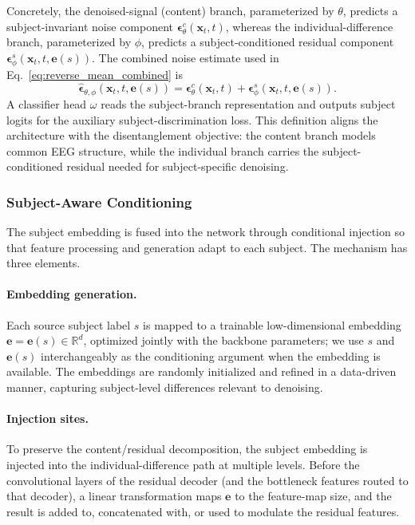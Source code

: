 Concretely, the denoised-signal (content) branch, parameterized by $\theta$,
predicts a subject-invariant noise component
$\boldsymbol{\epsilon}^{c}_{\theta}(\mathbf{x}_t,t)$, whereas the
individual-difference branch, parameterized by $\phi$, predicts a
subject-conditioned residual component
$\boldsymbol{\epsilon}^{s}_{\phi}(\mathbf{x}_t,t,\mathbf{e}(s))$. The combined
noise estimate used in Eq.~\eqref{eq:reverse_mean_combined} is
\begin{equation}
  \widehat{\boldsymbol{\epsilon}}_{\theta,\phi}
  (\mathbf{x}_t,t,\mathbf{e}(s))
  =
  \boldsymbol{\epsilon}^{c}_{\theta}(\mathbf{x}_t,t)
  +
  \boldsymbol{\epsilon}^{s}_{\phi}(\mathbf{x}_t,t,\mathbf{e}(s)).
  \label{eq:combined_epsilon}
\end{equation}
A classifier head $\omega$ reads the subject-branch representation and outputs
subject logits for the auxiliary subject-discrimination loss. This definition
aligns the architecture with the disentanglement objective: the content branch
models common EEG structure, while the individual branch carries the
subject-conditioned residual needed for subject-specific denoising.



\subsubsection{Subject-Aware Conditioning}
The subject embedding is fused into the network through conditional injection so
that feature processing and generation adapt to each subject. The mechanism has
three elements.

\paragraph{Embedding generation.} Each source subject label $s$ is mapped to a
trainable low-dimensional embedding $\mathbf{e}=\mathbf{e}(s)\in\mathbb{R}^{d}$,
optimized jointly with the backbone parameters; we use $s$ and $\mathbf{e}(s)$
interchangeably as the conditioning argument when the embedding is available.
The embeddings are randomly initialized and refined in a data-driven manner,
capturing subject-level differences relevant to denoising.

\paragraph{Injection sites.} To preserve the content/residual decomposition,
the subject embedding is injected into the individual-difference path at multiple
levels. Before the convolutional layers of the residual decoder (and the
bottleneck features routed to that decoder), a linear transformation maps
$\mathbf{e}$ to the feature-map size, and the result is added to, concatenated
with, or used to modulate the residual features.

